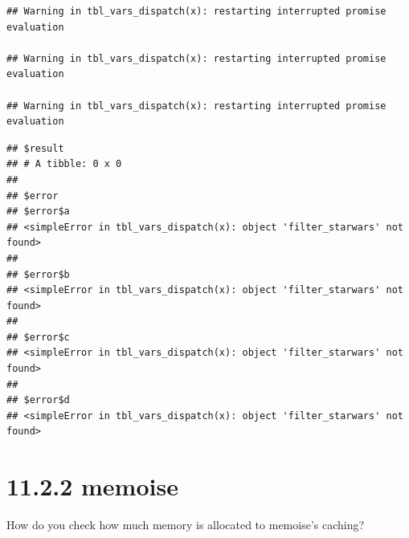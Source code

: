 \documentclass[]{book}
\newenvironment{Shaded}{\begin{snugshade}}{\end{snugshade}}
\newcommand{\ControlFlowTok}[1]{\textcolor[rgb]{0.13,0.29,0.53}{\textbf{#1}}}
\newcommand{\DecValTok}[1]{\textcolor[rgb]{0.00,0.00,0.81}{#1}}
\newcommand{\KeywordTok}[1]{\textcolor[rgb]{0.13,0.29,0.53}{\textbf{#1}}}
\newcommand{\NormalTok}[1]{#1}
\newcommand{\OperatorTok}[1]{\textcolor[rgb]{0.81,0.36,0.00}{\textbf{#1}}}
\newcommand{\StringTok}[1]{\textcolor[rgb]{0.31,0.60,0.02}{#1}}
\begin{document}
\begin{verbatim}
## Warning in tbl_vars_dispatch(x): restarting interrupted promise evaluation

## Warning in tbl_vars_dispatch(x): restarting interrupted promise evaluation

## Warning in tbl_vars_dispatch(x): restarting interrupted promise evaluation
\end{verbatim}

\begin{verbatim}
## $result
## # A tibble: 0 x 0
## 
## $error
## $error$a
## <simpleError in tbl_vars_dispatch(x): object 'filter_starwars' not found>
## 
## $error$b
## <simpleError in tbl_vars_dispatch(x): object 'filter_starwars' not found>
## 
## $error$c
## <simpleError in tbl_vars_dispatch(x): object 'filter_starwars' not found>
## 
## $error$d
## <simpleError in tbl_vars_dispatch(x): object 'filter_starwars' not found>
\end{verbatim}

\hypertarget{memoise}{%
\section*{11.2.2 memoise}\label{memoise}}

How do you check how much memory is allocated to memoise's caching?

\begin{Shaded}
\end{Shaded}
\end{document}
